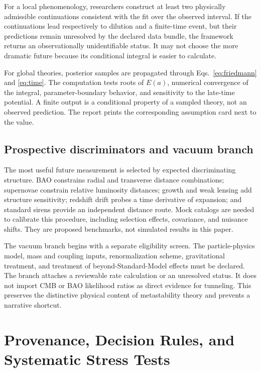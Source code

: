 \documentclass[conference]{IEEEtran}
\begin{document}
For a local phenomenology, researchers construct at least two physically admissible continuations consistent with the fit over the observed interval. If the continuations lead respectively to dilution and a finite-time event, but their predictions remain unresolved by the declared data bundle, the framework returns an observationally unidentifiable status. It may not choose the more dramatic future because its conditional integral is easier to calculate.

For global theories, posterior samples are propagated through Eqs.~\eqref{eq:friedmann} and \eqref{eq:time}. The computation tests roots of \(E(a)\), numerical convergence of the integral, parameter-boundary behavior, and sensitivity to the late-time potential. A finite output is a conditional property of a sampled theory, not an observed prediction. The report prints the corresponding assumption card next to the value.

\subsection{Prospective discriminators and vacuum branch}

The most useful future measurement is selected by expected discriminating structure. BAO constrains radial and transverse distance combinations; supernovae constrain relative luminosity distances; growth and weak lensing add structure sensitivity; redshift drift probes a time derivative of expansion; and standard sirens provide an independent distance route. Mock catalogs are needed to calibrate this procedure, including selection effects, covariance, and nuisance shifts. They are proposed benchmarks, not simulated results in this paper.

The vacuum branch begins with a separate eligibility screen. The particle-physics model, mass and coupling inputs, renormalization scheme, gravitational treatment, and treatment of beyond-Standard-Model effects must be declared. The branch attaches a reviewable rate calculation or an unresolved status. It does not import CMB or BAO likelihood ratios as direct evidence for tunneling. This preserves the distinctive physical content of metastability theory and prevents a narrative shortcut.

\section{Provenance, Decision Rules, and Systematic Stress Tests}
\end{document}
